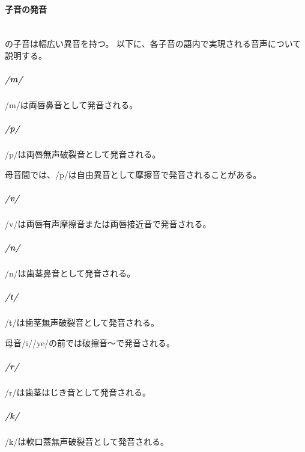 \paragraph{子音の発音}\quad\\
\langname の子音は幅広い異音を持つ。
以下に、各子音の語内で実現される音声について説明する。

\subparagraph{/m/}
/m/は両唇鼻音\textipa{[m]}として発音される。

\subparagraph{/p/}
/p/は両唇無声破裂音\textipa{[p]}として発音される。

母音間では、/p/は自由異音として摩擦音\textipa{[F]}で発音されることがある。

\subparagraph{/v/}
/v/は両唇有声摩擦音\textipa{[B]}または両唇接近音\textipa{[\textlowering{B}]}で発音される。

\subparagraph{/n/}
/n/は歯茎鼻音\textipa{[n]}として発音される。

\subparagraph{/t/}
/t/は歯茎無声破裂音\textipa{[t]}として発音される。

母音/i//ye/の前では破擦音\textipa{[\t{ts}]}～\textipa{[\t{tS}]}で発音される。

\subparagraph{/r/}
/r/は歯茎はじき音\textipa{[R]}として発音される。

\subparagraph{/k/}
/k/は軟口蓋無声破裂音\textipa{[k]}として発音される。
